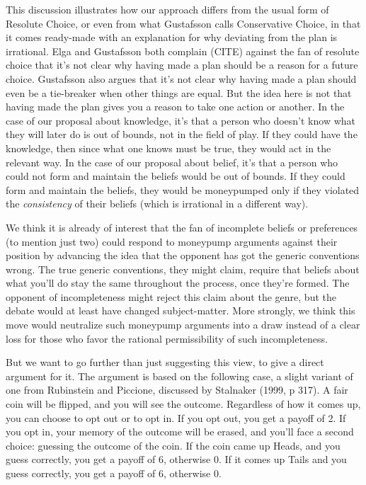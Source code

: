 \documentclass[
  11pt,
  letterpaper,
  DIV=11,
  numbers=noendperiod,
  twoside]{scrartcl}
\begin{document}
This discussion illustrates how our approach differs from the usual form
of Resolute Choice, or even from what Gustafsson calls Conservative
Choice, in that it comes ready-made with an explanation for why
deviating from the plan is irrational. Elga and Gustafsson both complain
(CITE) against the fan of resolute choice that it's not clear why having
made a plan should be a reason for a future choice. Gustafsson also
argues that it's not clear why having made a plan should even be a
tie-breaker when other things are equal. But the idea here is not that
having made the plan gives you a reason to take one action or another.
In the case of our proposal about knowledge, it's that a person who
doesn't know what they will later do is out of bounds, not in the field
of play. If they could have the knowledge, then since what one knows
must be true, they would act in the relevant way. In the case of our
proposal about belief, it's that a person who could not form and
maintain the beliefs would be out of bounds. If they could form and
maintain the beliefs, they would be moneypumped only if they violated
the \emph{consistency} of their beliefs (which is irrational in a
different way).

We think it is already of interest that the fan of incomplete beliefs or
preferences (to mention just two) could respond to moneypump arguments
against their position by advancing the idea that the opponent has got
the generic conventions wrong. The true generic conventions, they might
claim, require that beliefs about what you'll do stay the same
throughout the process, once they're formed. The opponent of
incompleteness might reject this claim about the genre, but the debate
would at least have changed subject-matter. More strongly, we think this
move would neutralize such moneypump arguments into a draw instead of a
clear loss for those who favor the rational permissibility of such
incompleteness.

But we want to go further than just suggesting this view, to give a
direct argument for it. The argument is based on the following case, a
slight variant of one from Rubinstein and Piccione, discussed by
Stalnaker (1999, p 317). A fair coin will be flipped, and you will see
the outcome. Regardless of how it comes up, you can choose to opt out or
to opt in. If you opt out, you get a payoff of 2. If you opt in, your
memory of the outcome will be erased, and you'll face a second choice:
guessing the outcome of the coin. If the coin came up Heads, and you
guess correctly, you get a payoff of 6, otherwise 0. If it comes up
Tails and you guess correctly, you get a payoff of 6, otherwise 0.
\end{document}
